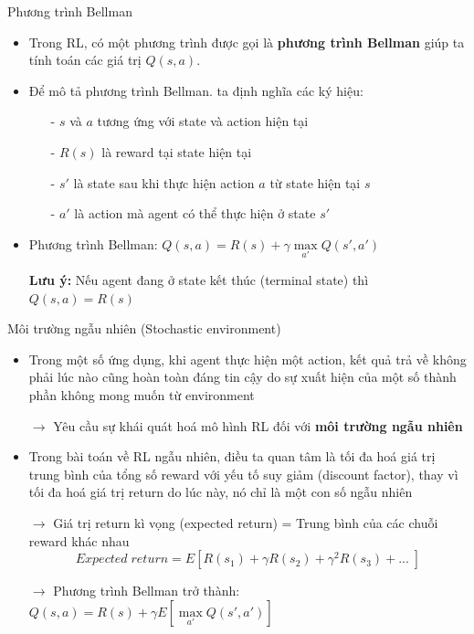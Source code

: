 \documentclass[10pt,aspectratio=169]{beamer}
\begin{document}
\begin{frame}{Phương trình Bellman}{\subsecname}
\begin{itemize}
\setlength\itemsep{8pt}
\item Trong RL, có một phương trình được gọi là \textbf{phương trình Bellman} giúp ta tính toán các giá trị $ Q(s,a) $.
\item Để mô tả phương trình Bellman. ta định nghĩa các ký hiệu:
\begin{itemize}
\setlength\itemsep{4pt}
\item[-] $ s $ và $ a $ tương ứng với state và action hiện tại
\item[-] $ R(s) $ là reward tại state hiện tại
\item[-] $ s' $ là state sau khi thực hiện action $ a $ từ state hiện tại $ s $
\item[-] $ a' $ là action mà agent có thể thực hiện ở state $ s' $
\end{itemize}
\item Phương trình Bellman: \textcolor{mainblue}{$ Q(s,a) = R(s) + \gamma\max\limits_{a'} Q(s',a') $}
\item[] \textcolor{mainblue}{\textbf{Lưu ý:}} Nếu agent đang ở state kết thúc (terminal state) thì \textcolor{mainblue}{$ Q(s,a) = R(s) $} 
\end{itemize}
\end{frame}

\begin{frame}{Môi trường ngẫu nhiên (Stochastic environment)}{\subsecname}
\begin{itemize}
\setlength\itemsep{8pt}
\item Trong một số ứng dụng, khi agent thực hiện một action, kết quả trả về không phải lúc nào cũng hoàn toàn đáng tin cậy do sự xuất hiện của một số thành phần không mong muốn từ environment
\item[] $ \longrightarrow $ Yêu cầu sự khái quát hoá mô hình RL đối với \textbf{môi trường ngẫu nhiên}
\item Trong bài toán về RL ngẫu nhiên, điều ta quan tâm là tối đa hoá giá trị trung bình của tổng số reward với yếu tố suy giảm (discount factor), thay vì tối đa hoá giá trị return do lúc này, nó chỉ là một con số ngẫu nhiên
\item[] $ \longrightarrow $ Giá trị return kì vọng (expected return) = Trung bình của các chuỗi reward khác nhau
\begin{equation*}
Expected\;return = E[R(s_1) + \gamma R(s_2) + \gamma^2 R(s_3) + ...\;]
\end{equation*}
\item[] $ \longrightarrow $ Phương trình Bellman trở thành: \textcolor{mainblue}{$ Q(s,a) = R(s) + \gamma E[\max\limits_{a'} Q(s',a')] $}
\end{itemize}
\end{frame}
\end{document}
